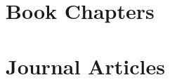 \documentclass{article}
\begin{document}
\pbib


\section{Book Chapters}

\begin{refsegment}


  \nocite{las-2014-bigdata}
  \nocite{las-2013-fg-bookchapter}  
  \nocite{las-2011-ondemand}
  \nocite{las-2011-greenchapter}
  \nocite{las-2009-cloudcomp}
  \nocite{las-2007-workflow}
  \nocite{las-2006-workcoordination}
  \nocite{las-2006-workflow-book}
  \nocite{las-2005-qos-book}
  \nocite{las-2004-middleware}
  \nocite{las-2004-gestalt}
  \nocite{las-2004-grid-pattern}
  \nocite{las-2004-grid-midleware}
  \nocite{las-2003-gridcomputing}
  \nocite{las-2003-cmt-book}
  \nocite{las-1998-telemedicine}
  
\end{refsegment}


\pbib


\section{Journal Articles}
\end{document}
